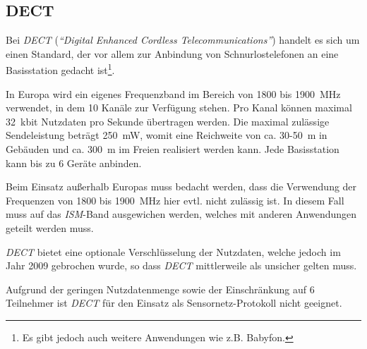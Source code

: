     \subsection{DECT}

        Bei \emph{DECT} (\emph{"`Digital Enhanced Cordless Telecommunications"'}) handelt es sich um einen Standard, 
        der vor allem zur Anbindung von Schnurlostelefonen an eine Basisstation gedacht ist\footnote{Es gibt
        jedoch auch weitere Anwendungen wie z.B. Babyfon.}. 

        In Europa wird ein eigenes Frequenzband im Bereich von 1800 bis 1900~MHz verwendet, in dem 10 
        Kanäle zur Verfügung stehen. Pro Kanal können maximal 32~kbit Nutzdaten pro Sekunde übertragen
        werden. Die maximal zulässige Sendeleistung beträgt 250~mW, womit eine Reichweite von ca. 30-50~m 
        in Gebäuden und ca. 300~m im Freien realisiert werden kann. Jede Basisstation kann
        bis zu 6 Geräte anbinden.

        Beim Einsatz außerhalb Europas muss bedacht werden, dass die Verwendung der Frequenzen von
        1800 bis 1900~MHz hier evtl. nicht zulässig ist. In diesem Fall muss auf das \emph{ISM}-Band 
        ausgewichen werden, welches  mit anderen Anwendungen geteilt werden muss.
        \cite{etsi_dect}

        \emph{DECT} bietet eine optionale Verschlüsselung der Nutzdaten, welche jedoch im Jahr 2009 gebrochen 
        wurde, so dass \emph{DECT} mittlerweile als unsicher gelten muss. \cite{dedected}

        Aufgrund der geringen Nutzdatenmenge sowie der Einschränkung auf 6 Teilnehmer ist
        \emph{DECT} für den Einsatz als Sensornetz-Protokoll nicht geeignet.

